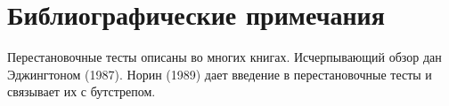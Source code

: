 \section{Библиографические примечания}

Перестановочные тесты описаны во многих книгах. Исчерпывающий обзор дан Эджингтоном (1987). Норин (1989) дает введение в перестановочные тесты и связывает их с бутстрепом.